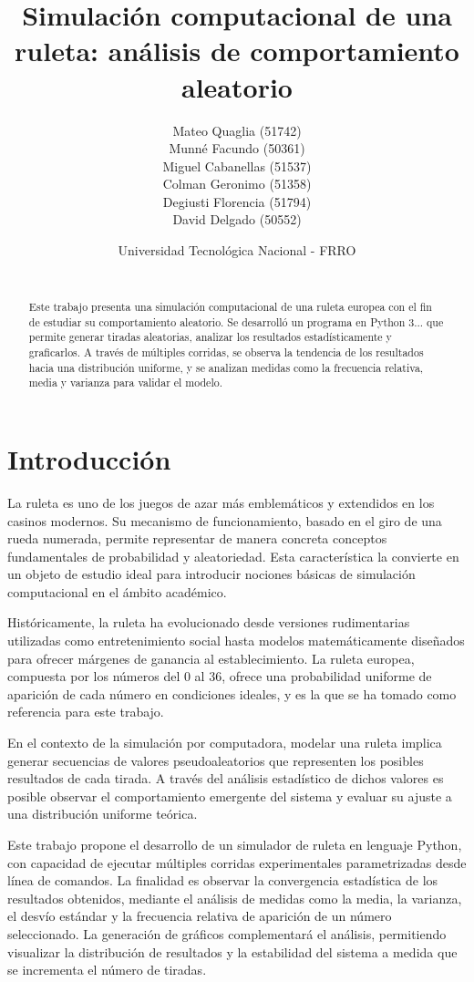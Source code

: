 \documentclass{article}
\title{Simulación computacional de una ruleta: análisis de comportamiento aleatorio}
\author{
Mateo Quaglia (51742) \\
\And
Munné Facundo (50361) \\
\And
Miguel Cabanellas (51537) \\
\And
Colman Geronimo (51358) \\
\And
Degiusti Florencia (51794) \\
\And
David Delgado (50552) \\
\and
Universidad Tecnológica Nacional - FRRO\\
\texttt{} \\
}
\begin{document}
\maketitle

\begin{abstract}
Este trabajo presenta una simulación computacional de una ruleta europea con el fin de estudiar su comportamiento aleatorio. Se desarrolló un programa en Python 3... que permite generar tiradas aleatorias, analizar los resultados estadísticamente y graficarlos. A través de múltiples corridas, se observa la tendencia de los resultados hacia una distribución uniforme, y se analizan medidas como la frecuencia relativa, media y varianza para validar el modelo.
\end{abstract}



\section{Introducción}

La ruleta es uno de los juegos de azar más emblemáticos y extendidos en los casinos modernos. Su mecanismo de funcionamiento, basado en el giro de una rueda numerada, permite representar de manera concreta conceptos fundamentales de probabilidad y aleatoriedad. Esta característica la convierte en un objeto de estudio ideal para introducir nociones básicas de simulación computacional en el ámbito académico.

Históricamente, la ruleta ha evolucionado desde versiones rudimentarias utilizadas como entretenimiento social hasta modelos matemáticamente diseñados para ofrecer márgenes de ganancia al establecimiento. La ruleta europea, compuesta por los números del 0 al 36, ofrece una probabilidad uniforme de aparición de cada número en condiciones ideales, y es la que se ha tomado como referencia para este trabajo.

En el contexto de la simulación por computadora, modelar una ruleta implica generar secuencias de valores pseudoaleatorios que representen los posibles resultados de cada tirada. A través del análisis estadístico de dichos valores es posible observar el comportamiento emergente del sistema y evaluar su ajuste a una distribución uniforme teórica.

Este trabajo propone el desarrollo de un simulador de ruleta en lenguaje Python, con capacidad de ejecutar múltiples corridas experimentales parametrizadas desde línea de comandos. La finalidad es observar la convergencia estadística de los resultados obtenidos, mediante el análisis de medidas como la media, la varianza, el desvío estándar y la frecuencia relativa de aparición de un número seleccionado. La generación de gráficos complementará el análisis, permitiendo visualizar la distribución de resultados y la estabilidad del sistema a medida que se incrementa el número de tiradas.
\end{document}
